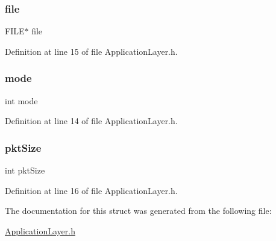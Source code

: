 \subsubsection{\texorpdfstring{file}{file}}
{\footnotesize\ttfamily F\+I\+LE$\ast$ file}



Definition at line 15 of file Application\+Layer.\+h.

\hypertarget{struct_application_layer_a1ea5d0cb93f22f7d0fdf804bd68c3326}{}\label{struct_application_layer_a1ea5d0cb93f22f7d0fdf804bd68c3326} 
\subsubsection{\texorpdfstring{mode}{mode}}
{\footnotesize\ttfamily int mode}



Definition at line 14 of file Application\+Layer.\+h.

\hypertarget{struct_application_layer_a84ec7b711a9ead8ee3f585398d7b6df6}{}\label{struct_application_layer_a84ec7b711a9ead8ee3f585398d7b6df6} 
\subsubsection{\texorpdfstring{pkt\+Size}{pktSize}}
{\footnotesize\ttfamily int pkt\+Size}



Definition at line 16 of file Application\+Layer.\+h.



The documentation for this struct was generated from the following file\+:\begin{DoxyCompactItemize}
\item 
\hyperlink{_application_layer_8h}{Application\+Layer.\+h}\end{DoxyCompactItemize}
